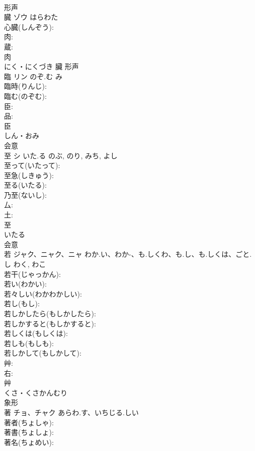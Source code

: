 \documentclass[8pt]{extreport}
\begin{document}
\begin{CJK}{UTF8}{min}
\\	形声 
\\	臓	ゾウ	はらわた		
\\	心臓(しんぞう): 
\\	肉: 
\\	蔵: 
\\	肉	
\\	にく・にくづき	臟	形声 
\\	臨	リン	のぞ.む	み	
\\	臨時(りんじ): 
\\	臨む(のぞむ): 
\\	臣: 
\\	品: 
\\	臣	
\\	しん・おみ	
\\	会意 
\\	至	シ	いた.る	のぶ, のり, みち, よし	
\\	至って(いたって): 
\\	至急(しきゅう): 
\\	至る(いたる): 
\\	乃至(ないし): 
\\	厶: 
\\	土: 
\\	至	
\\	いたる	
\\	会意 
\\	若	ジャク、ニャク、ニャ	わか.い、わか-、も.しくわ、も.し、も.しくは、ごと.し	わく, わこ	
\\	若干(じゃっかん): 
\\	若い(わかい): 
\\	若々しい(わかわかしい): 
\\	若し(もし): 
\\	若しかしたら(もしかしたら): 
\\	若しかすると(もしかすると): 
\\	若しくは(もしくは): 
\\	若しも(もしも): 
\\	若しかして(もしかして): 
\\	艸: 
\\	右: 
\\	艸	
\\	くさ・くさかんむり	
\\	象形 
\\	著	チョ、チャク	あらわ.す、いちじる.しい		
\\	著者(ちょしゃ): 
\\	著書(ちょしょ): 
\\	著名(ちょめい): 

\end{CJK}
\end{document}
